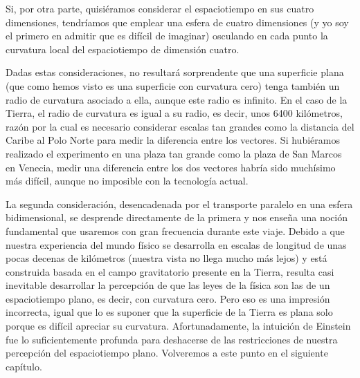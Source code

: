 Si, por otra parte, quisiéramos considerar el espaciotiempo en sus cuatro dimensiones,
tendríamos que emplear una esfera de cuatro dimensiones (y yo soy el primero en admitir que es
difícil de imaginar) osculando en cada punto la curvatura local del espaciotiempo de dimensión
cuatro.

Dadas estas consideraciones, no resultará sorprendente que una superficie plana (que como hemos
visto es una superficie con curvatura cero) tenga también un radio de curvatura asociado a
ella, aunque este radio es infinito. En el caso de la Tierra, el radio de curvatura es igual a
su radio, es decir, unos 6400 kilómetros, razón por la cual es necesario considerar escalas tan
grandes como la distancia del Caribe al Polo Norte para medir la diferencia entre los vectores.
Si hubiéramos realizado el experimento en una plaza tan grande como la plaza de San Marcos en
Venecia, medir una diferencia entre los dos vectores habría sido muchísimo más difícil, aunque
no imposible con la tecnología actual.

La segunda consideración, desencadenada por el transporte paralelo en una esfera bidimensional,
se desprende directamente de la primera y nos enseña una noción fundamental que usaremos con
gran frecuencia durante este viaje. Debido a que nuestra experiencia del mundo físico se
desarrolla en escalas de longitud de unas pocas decenas de kilómetros (nuestra vista no llega
mucho más lejos) y está construida basada en el campo gravitatorio presente en la Tierra,
resulta casi inevitable desarrollar la percepción de que las leyes de la física son las de un
espaciotiempo plano, es decir, con curvatura cero. Pero eso es una impresión incorrecta, igual
que lo es suponer que la superficie de la Tierra es plana solo porque es difícil apreciar su
curvatura. Afortunadamente, la intuición de Einstein fue lo suficientemente profunda para
deshacerse de las restricciones de nuestra percepción del espaciotiempo plano. Volveremos a
este punto en el siguiente capítulo.

